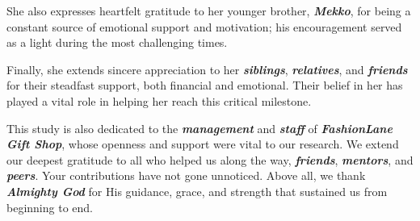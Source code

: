 {She also expresses heartfelt gratitude to her younger brother, \textbf{\textit{Mekko}}, for being a constant source of emotional support and motivation; his encouragement served as a light during the most challenging times.

Finally, she extends sincere appreciation to her \textbf{\textit{siblings}}, \textbf{\textit{relatives}}, and \textbf{\textit{friends}} for their steadfast support, both financial and emotional. Their belief in her has played a vital role in helping her reach this critical milestone.

This study is also dedicated to the \textbf{\textit{management}} and \textbf{\textit{staff}} of \textbf{\textit{FashionLane Gift Shop}}, whose openness and support were vital to our research. We extend our deepest gratitude to all who helped us along the way, \textbf{\textit{friends}}, \textbf{\textit{mentors}}, and \textbf{\textit{peers}}. Your contributions have not gone unnoticed. Above all, we thank \textbf{\textit{Almighty God}} for His guidance, grace, and strength that sustained us from beginning to end.

}